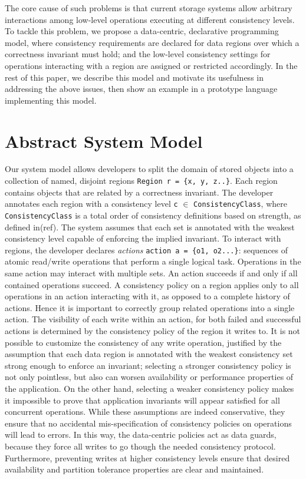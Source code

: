 \documentclass[preprint, numbers]{sigplanconf}
\begin{document}
The core cause of such problems is that current storage systems allow arbitrary
interactions among low-level operations executing at different consistency levels. To
tackle this problem, we propose a data-centric, declarative programming model, where
consistency requirements are declared for data regions over which a correctness
invariant must hold; and the low-level consistency settings for operations interacting with
a region are assigned or restricted accordingly. In the rest of this paper, we describe this
model and motivate its usefulness in addressing the above issues, then show
an example in a prototype language implementing this model.

\section{Abstract System Model}
Our system model allows developers to split the domain of stored objects into a
collection of named, disjoint
regions \texttt{Region r = \{x, y, z..\}}. Each
region contains objects that are related by a correctness invariant. The
developer annotates each region with a consistency level \texttt{c} $\in$
\texttt{ConsistencyClass}, where \texttt{ConsistencyClass} is a total order of
consistency definitions based on strength, as defined in(ref). The system assumes that each
set is annotated with the weakest consistency level capable of
enforcing the implied invariant. To interact with regions, the developer
declares \emph{actions} \texttt{action a = \{o1, o2...\}}: sequences of atomic
read/write operations that perform a single logical task.
Operations in the same action may interact with multiple sets. An action succeeds if and only if
all contained operations succeed. A consistency policy on a region applies only to
all operations in an action interacting with it, as opposed to a complete
history of actions. Hence it is important to
correctly group related operations into a single action. The visibility
of each write within an action, for both failed and successful
actions is determined by the consistency policy of the region it writes to. It
is not possible to customize the consistency of any write operation, justified
by the assumption that each data region is annotated with the weakest
consistency set strong enough to enforce an invariant; selecting a stronger
consistency policy is not only pointless, but also can worsen
availability or performance properties of the application. On the other hand,
selecting a weaker consistency policy makes it impossible to prove that
application invariants will appear satisfied for all concurrent operations.
While these assumptions are indeed conservative, they ensure that no accidental
mis-specification of consistency policies on operations will lead to errors. In this way, the
data-centric policies act as data guards, because they force all writes to go
though the needed consistency protocol. Furthermore, preventing writes at higher
consistency levels ensure that desired availability and partition tolerance
properties are clear and maintained. 
\end{document}

